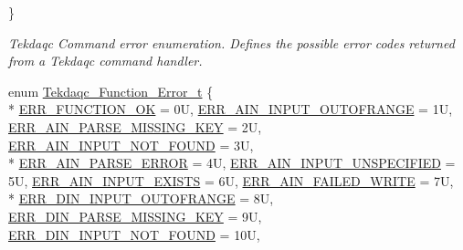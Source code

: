 \begin{DoxyCompactItemize}
 \}
\begin{DoxyCompactList}\small\item\em Tekdaqc Command error enumeration. Defines the possible error codes returned from a Tekdaqc command handler. \end{DoxyCompactList}\item 
enum \hyperlink{group__tekdaqc__error_ga19df05d919ecca7a7501b35ae9080a32}{Tekdaqc\-\_\-\-Function\-\_\-\-Error\-\_\-t} \{ \\*
\hyperlink{group__tekdaqc__error_gga19df05d919ecca7a7501b35ae9080a32adbd1baeb84ff2e0675efec2cfb5d677f}{E\-R\-R\-\_\-\-F\-U\-N\-C\-T\-I\-O\-N\-\_\-\-O\-K} = 0\-U, 
\hyperlink{group__tekdaqc__error_gga19df05d919ecca7a7501b35ae9080a32a71ee91203426300e273e2b346785bb26}{E\-R\-R\-\_\-\-A\-I\-N\-\_\-\-I\-N\-P\-U\-T\-\_\-\-O\-U\-T\-O\-F\-R\-A\-N\-G\-E} = 1\-U, 
\hyperlink{group__tekdaqc__error_gga19df05d919ecca7a7501b35ae9080a32a03d08bf529d617e465695a3f96edaa1a}{E\-R\-R\-\_\-\-A\-I\-N\-\_\-\-P\-A\-R\-S\-E\-\_\-\-M\-I\-S\-S\-I\-N\-G\-\_\-\-K\-E\-Y} = 2\-U, 
\hyperlink{group__tekdaqc__error_gga19df05d919ecca7a7501b35ae9080a32ad439d1a813dcd3ec1fb1f02ea9c48de6}{E\-R\-R\-\_\-\-A\-I\-N\-\_\-\-I\-N\-P\-U\-T\-\_\-\-N\-O\-T\-\_\-\-F\-O\-U\-N\-D} = 3\-U, 
\\*
\hyperlink{group__tekdaqc__error_gga19df05d919ecca7a7501b35ae9080a32aff1ca17cabd0dd977fc36306e75ddde5}{E\-R\-R\-\_\-\-A\-I\-N\-\_\-\-P\-A\-R\-S\-E\-\_\-\-E\-R\-R\-O\-R} = 4\-U, 
\hyperlink{group__tekdaqc__error_gga19df05d919ecca7a7501b35ae9080a32a2abd9d0573b1d25ca7ebd6908f60a6e8}{E\-R\-R\-\_\-\-A\-I\-N\-\_\-\-I\-N\-P\-U\-T\-\_\-\-U\-N\-S\-P\-E\-C\-I\-F\-I\-E\-D} = 5\-U, 
\hyperlink{group__tekdaqc__error_gga19df05d919ecca7a7501b35ae9080a32a0778912810bb451eb4dd697747d86d12}{E\-R\-R\-\_\-\-A\-I\-N\-\_\-\-I\-N\-P\-U\-T\-\_\-\-E\-X\-I\-S\-T\-S} = 6\-U, 
\hyperlink{group__tekdaqc__error_gga19df05d919ecca7a7501b35ae9080a32a975357a0892bf2f1cbb6fd1d8640e2f6}{E\-R\-R\-\_\-\-A\-I\-N\-\_\-\-F\-A\-I\-L\-E\-D\-\_\-\-W\-R\-I\-T\-E} = 7\-U, 
\\*
\hyperlink{group__tekdaqc__error_gga19df05d919ecca7a7501b35ae9080a32a47828fbba0edc80230aa02ef32a7552a}{E\-R\-R\-\_\-\-D\-I\-N\-\_\-\-I\-N\-P\-U\-T\-\_\-\-O\-U\-T\-O\-F\-R\-A\-N\-G\-E} = 8\-U, 
\hyperlink{group__tekdaqc__error_gga19df05d919ecca7a7501b35ae9080a32ac884dc2c6d2c2608cbe3e7f5717ca05a}{E\-R\-R\-\_\-\-D\-I\-N\-\_\-\-P\-A\-R\-S\-E\-\_\-\-M\-I\-S\-S\-I\-N\-G\-\_\-\-K\-E\-Y} = 9\-U, 
\hyperlink{group__tekdaqc__error_gga19df05d919ecca7a7501b35ae9080a32ad3630050d57231d48a260d4b4a4ac4d1}{E\-R\-R\-\_\-\-D\-I\-N\-\_\-\-I\-N\-P\-U\-T\-\_\-\-N\-O\-T\-\_\-\-F\-O\-U\-N\-D} = 10\-U, 

\end{DoxyCompactItemize}

